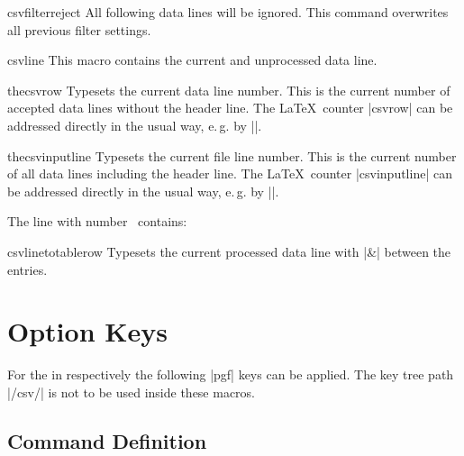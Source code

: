 \documentclass[a4paper,11pt]{ltxdoc}
\begin{document}
\begin{docCommand}{csvfilterreject}{}
  All following data lines will be ignored.
  This command overwrites all previous filter settings.
\end{docCommand}


\begin{docCommand}{csvline}{}
  This macro contains the current and unprocessed data line.
\begin{dispExample}
%
\end{dispExample}
\end{docCommand}


\begin{docCommand}{thecsvrow}{}
  Typesets the current data line number. This is the
  current number of accepted data lines without the header line.
  The \LaTeX\ counter |csvrow| can be addressed directly in the usual way,
  e.\,g. by ||.
\end{docCommand}


\begin{docCommand}{thecsvinputline}{}
  Typesets the current file line number. This is the
  current number of all data lines including the header line.
  The \LaTeX\ counter |csvinputline| can be addressed directly in the usual way,
  e.\,g. by ||.
\begin{dispExample}
%
  {The line with number \thecsvinputline\ contains: \csvline}%
\end{dispExample}
\end{docCommand}


\begin{docCommand}{csvlinetotablerow}{}
  Typesets the current processed data line with |&| between the entries.
\end{docCommand}



\clearpage
\section{Option Keys}\label{sec:schluessel}%
For the  in  respectively 
the following |pgf| keys can be applied. The key tree path |/csv/| is not
to be used inside these macros.


\subsection{Command Definition}%
\end{document}
